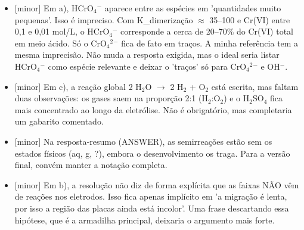 \documentclass{article}%
\begin{document}
\begin{itemize}%
\item%
{[}minor{]} Em a), HCrO$_{4}$$^{-}$ aparece entre as espécies em 'quantidades muito pequenas'. Isso é impreciso. Com K\_dimerização $\approx$ 35--100 e Cr(VI) entre 0,1 e 0,01 mol/L, o HCrO$_{4}$$^{-}$ corresponde a cerca de 20--70\% do Cr(VI) total em meio ácido. Só o CrO$_{4}$$^2$$^{-}$ fica de fato em traços. A minha referência tem a mesma imprecisão. Não muda a resposta exigida, mas o ideal seria listar HCrO$_{4}$$^{-}$ como espécie relevante e deixar o 'traços' só para CrO$_{4}$$^2$$^{-}$ e OH$^{-}$.%
\item%
{[}minor{]} Em c), a reação global 2 H$_{2}$O $\to$ 2 H$_{2}$ + O$_{2}$ está escrita, mas faltam duas observações: os gases saem na proporção 2:1 (H$_{2}$:O$_{2}$) e o H$_{2}$SO$_{4}$ fica mais concentrado ao longo da eletrólise. Não é obrigatório, mas completaria um gabarito comentado.%
\item%
{[}minor{]} Na resposta{-}resumo (ANSWER), as semirreações estão sem os estados físicos (aq, g, ?), embora o desenvolvimento os traga. Para a versão final, convém manter a notação completa.%
\item%
{[}minor{]} Em b), a resolução não diz de forma explícita que as faixas NÃO vêm de reações nos eletrodos. Isso fica apenas implícito em 'a migração é lenta, por isso a região das placas ainda está incolor'. Uma frase descartando essa hipótese, que é a armadilha principal, deixaria o argumento mais forte.%
\end{itemize}%
\end{document}

